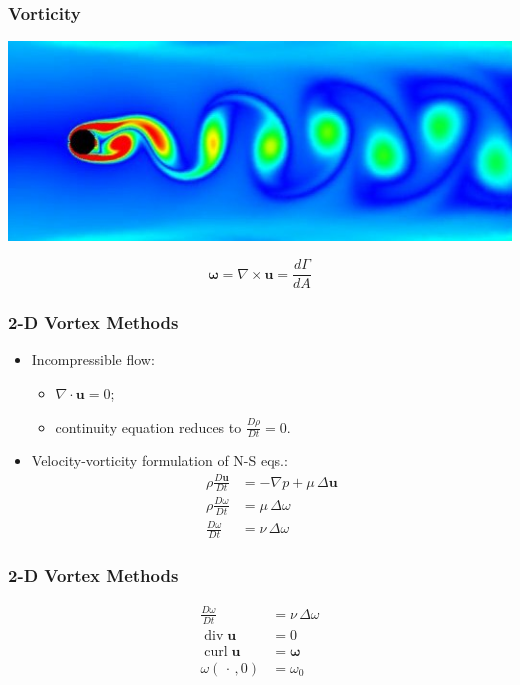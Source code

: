 \documentclass[12pt,english,dvipsnames]{beamer}
\renewcommand{\vec}{\mathbf}
\newcommand{\vel}{\vec u}    %
\DeclareMathOperator{\divergence}{div}
\DeclareMathOperator{\curl}{curl}
\newcommand{\md}[2]{\frac{D#1}{D#2}}
\begin{document}
  \begin{frame}
    \frametitle{Vorticity}
    \begin{center}
      \includegraphics[scale=.6]{cylinder-vorticity.jpg}
    \end{center}

    \[ \mathbold\omega = ∇\times\vel = \frac{dΓ}{dA} \]
  \end{frame}

  \begin{frame}
    \frametitle{2-D Vortex Methods}
    \begin{itemize}
      \item Incompressible flow:
        \begin{itemize}
          \item  \(∇\cdot\vel = 0\);
          \item continuity equation reduces to \(\displaystyle\md{ρ}{t} = 0\).
        \end{itemize}
      \item Velocity-vorticity formulation of N-S eqs.:
        \begin{align}
          ρ\md{\vel}{t} &= -∇p + μ\,Δ\vel \\
          ρ\md{ω}{t}    &= μ\,Δω \\
          \md{ω}{t}    &= ν\,Δω
        \end{align}
    \end{itemize}
  \end{frame}

  \begin{frame}
    \frametitle{2-D Vortex Methods}
    \begin{align}
      \md{ω}{t} &= ν\,Δω \\
      \divergence\vel &= 0 \\
      \curl\vel &= \mathbold\omega \\
      ω(\,\cdot\,, 0) &= ω_0
    \end{align}
  \end{frame}
\end{document}
